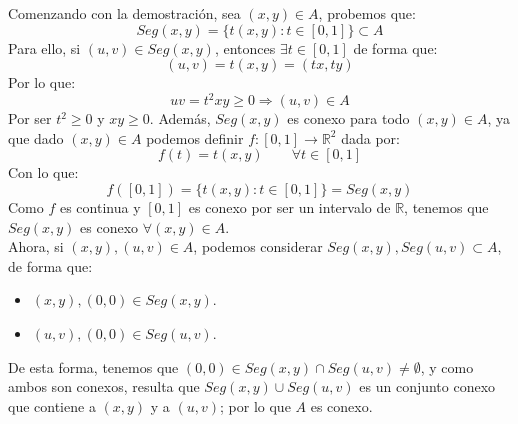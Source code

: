 \begin{ejercicio}
\noindent
Comenzando con la demostración, sea $(x,y)\in A$, probemos que:
\begin{equation*}
    Seg(x,y) = \{t(x,y) : t\in [0,1]\} \subset A
\end{equation*}
Para ello, si $(u,v)\in Seg(x,y)$, entonces $\exists t\in [0,1]$ de forma que:
\begin{equation*}
    (u,v) = t(x,y) = (tx,ty)
\end{equation*}
Por lo que:
\begin{equation*}
    uv = t^2xy \geq 0 \Longrightarrow (u,v) \in A
\end{equation*}
Por ser $t^2 \geq 0 $ y $xy \geq 0$. Además, $Seg(x,y)$ es conexo para todo $(x,y)\in A$, ya que dado $(x,y)\in A$ podemos definir $f:[0,1]\to \mathbb{R}^2$ dada por:
\begin{equation*}
    f(t) = t(x,y) \qquad \forall t\in [0,1]
\end{equation*}
Con lo que:
\begin{equation*}
    f([0,1]) = \{t(x,y) : t\in [0,1]\} = Seg(x,y)
\end{equation*}
Como $f$ es continua y $[0,1]$ es conexo por ser un intervalo de $\mathbb{R}$, tenemos que $Seg(x,y)$ es conexo $\forall (x,y)\in A$.\\

\noindent
Ahora, si $(x,y),(u,v)\in A$, podemos considerar $Seg(x,y),Seg(u,v)\subset A$, de forma que:
\begin{itemize}
    \item $(x,y),(0,0)\in Seg(x,y)$.
    \item $(u,v),(0,0)\in Seg(u,v)$.
\end{itemize}
De esta forma, tenemos que $(0,0)\in Seg(x,y)\cap Seg(u,v)\neq \emptyset $, y como ambos son conexos, resulta que $Seg(x,y)\cup Seg(u,v)$ es un conjunto conexo que contiene a $(x,y)$ y a $(u,v)$; por lo que $A$ es conexo.\\


\end{ejercicio}
